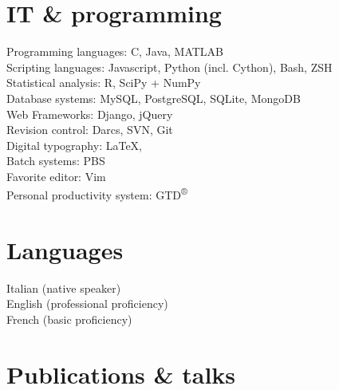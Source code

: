 \documentclass[10pt, a4paper]{article}
\begin{document}
\section*{IT \& programming}
Programming languages: C, Java, MATLAB\\
Scripting languages: Javascript, Python (incl. Cython), Bash, ZSH\\
Statistical analysis: R, SciPy + NumPy\\
Database systems: MySQL, PostgreSQL, SQLite, MongoDB\\
Web Frameworks: Django, jQuery\\
Revision control: Darcs, SVN, Git\\
Digital typography: \LaTeX, \XeTeX\\
Batch systems: PBS\\
Favorite editor: Vim\\
Personal productivity system: GTD\textsuperscript{®}

\section*{Languages}
Italian (native speaker)\\
English (professional proficiency)\\
French (basic proficiency)

\section*{Publications \& talks}
\end{document}
